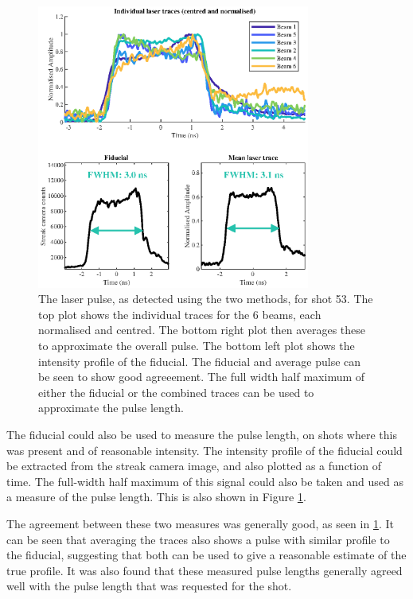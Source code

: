 \begin{figure} [h]
\begin{centering}
\includegraphics[width=0.8\textwidth]{figures/Experiment/FiduAndTrace.eps}%
\caption{\label{fig:Fidu and Trace} The laser pulse, as detected using the two methods, for shot 53. The top plot shows the individual traces for the 6 beams, each normalised and centred. The bottom right plot then averages these to approximate the overall pulse. The bottom left plot shows the intensity profile of the fiducial. The fiducial and average pulse can be seen to show good agreeement. The full width half maximum of either the fiducial or the combined traces can be used to approximate the pulse length.}
\end{centering}
\end{figure}

The fiducial could also be used to measure the pulse length, on shots where this was present and of reasonable intensity. The intensity profile of the fiducial could be extracted from the streak camera image, and also plotted as a function of time. The full-width half maximum of this signal could also be taken and used as a measure of the pulse length. This is also shown in Figure \ref{fig:Fidu and Trace}.

The agreement between these two measures was generally good, as seen in \ref{fig:Fidu and Trace}. It can be seen that averaging the traces also shows a pulse with similar profile to the fiducial, suggesting that both can be used to give a reasonable estimate of the true profile. It was also found that these measured pulse lengths generally agreed well with the pulse length that was requested for the shot. 

